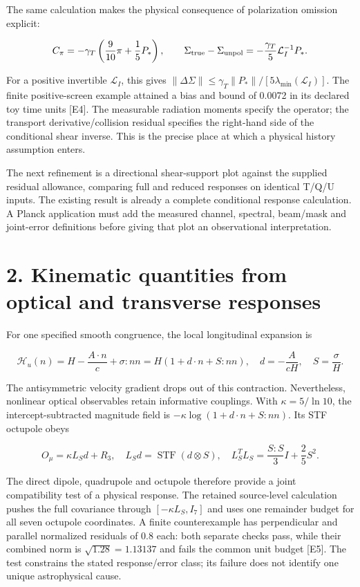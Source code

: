 \documentclass[
  10pt,
]{article}
\begin{document}
The same calculation makes the physical consequence of polarization
omission explicit:

\[
C_\pi=-\gamma_T\left(\frac9{10}\pi+\frac15P_*\right),
\qquad
\Sigma_{\rm true}-\Sigma_{\rm unpol}
=-\frac{\gamma_T}{5}\mathcal L_I^{-1}P_*.
\]

For a positive invertible \(\mathcal L_I\), this gives
\(\|\Delta\Sigma\|\le\gamma_T\|P_*\|/[5\lambda_{\min}(\mathcal L_I)]\).
The finite positive-screen example attained a bias and bound of 0.0072
in its declared toy time units {[}E4{]}. The measurable radiation
moments specify the operator; the transport derivative/collision
residual specifies the right-hand side of the conditional shear inverse.
This is the precise place at which a physical history assumption enters.

The next refinement is a directional shear-support plot against the
supplied residual allowance, comparing full and reduced responses on
identical T/Q/U inputs. The existing result is already a complete
conditional response calculation. A Planck application must add the
measured channel, spectral, beam/mask and joint-error definitions before
giving that plot an observational interpretation.

\hypertarget{kinematic-quantities-from-optical-and-transverse-responses}{%
\section{2. Kinematic quantities from optical and transverse
responses}\label{kinematic-quantities-from-optical-and-transverse-responses}}

For one specified smooth congruence, the local longitudinal expansion is

\[
\mathcal H_u(n)=H-\frac{A\cdot n}{c}+\sigma:nn
=H(1+d\cdot n+S:nn),
\quad d=-\frac{A}{cH},\quad S=\frac\sigma H.
\]

The antisymmetric velocity gradient drops out of this contraction.
Nevertheless, nonlinear optical observables retain informative
couplings. With \(\kappa=5/\ln10\), the intercept-subtracted magnitude
field is \(-\kappa\log(1+d\cdot n+S:nn)\). Its STF octupole obeys

\[
O_\mu=\kappa L_Sd+R_3,
\quad L_Sd=\operatorname{STF}(d\otimes S),
\quad L_S^TL_S=\frac{S:S}{3}I+\frac25S^2.
\]

The direct dipole, quadrupole and octupole therefore provide a joint
compatibility test of a physical response. The retained source-level
calculation pushes the full covariance through \([ -\kappa L_S,I_7]\)
and uses one remainder budget for all seven octupole coordinates. A
finite counterexample has perpendicular and parallel normalized
residuals of 0.8 each: both separate checks pass, while their combined
norm is \(\sqrt{1.28}=1.13137\) and fails the common unit budget
{[}E5{]}. The test constrains the stated response/error class; its
failure does not identify one unique astrophysical cause.
\end{document}
